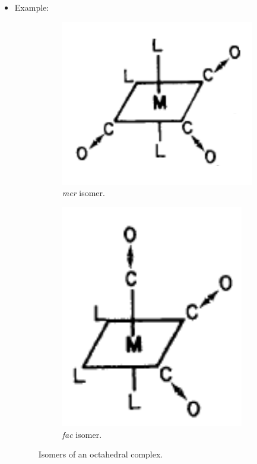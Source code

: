 \documentclass[../notes.tex]{subfiles}
\begin{document}
\begin{itemize}
    \item Example:
    \begin{figure}[h!]
        \centering
        \begin{subfigure}[b]{0.2\linewidth}
            \centering
            \includegraphics[width=0.8\linewidth]{../ExtFiles/ML3CO3a.png}
            \caption{\emph{mer} isomer.}
            \label{fig:ML3CO3a}
        \end{subfigure}
        \begin{subfigure}[b]{0.2\linewidth}
            \centering
            \includegraphics[width=0.63\linewidth]{../ExtFiles/ML3CO3b.png}
            \caption{\emph{fac} isomer.}
            \label{fig:ML3CO3b}
        \end{subfigure}
        \caption{Isomers of an octahedral  complex.}

\end{figure}
\end{itemize}
\end{document}
